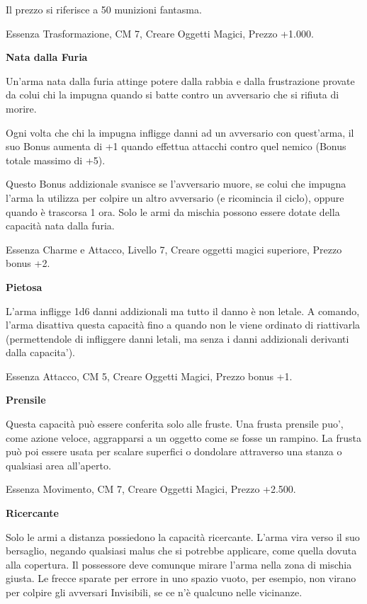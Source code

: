 \documentclass[a4paper,11pt,twoside,openany]{book}
\begin{document}
Il prezzo si riferisce a 50 munizioni fantasma.

Essenza Trasformazione, CM 7, Creare Oggetti Magici, Prezzo +1.000.

\textbf{Nata dalla Furia}

Un'arma nata dalla furia attinge potere dalla rabbia e dalla frustrazione provate da colui chi la impugna quando si batte contro un avversario che si rifiuta di morire.

Ogni volta che chi la impugna infligge danni ad un avversario con quest'arma, il suo Bonus aumenta di +1 quando effettua attacchi contro quel nemico (Bonus totale massimo di +5).

Questo Bonus addizionale svanisce se l'avversario muore, se colui che impugna l'arma la utilizza per colpire un altro avversario (e ricomincia il ciclo), oppure quando è trascorsa 1 ora. Solo le armi da mischia possono essere dotate della capacità nata dalla furia.

Essenza Charme e Attacco, Livello 7, Creare oggetti magici superiore, Prezzo bonus +2.

\textbf{Pietosa}

L'arma infligge 1d6 danni addizionali ma tutto il danno è non letale. A comando, l'arma disattiva questa capacità fino a quando non le viene ordinato di riattivarla (permettendole di infliggere danni letali, ma senza i danni addizionali derivanti dalla capacita').

Essenza Attacco, CM 5, Creare Oggetti Magici, Prezzo bonus +1.

\textbf{Prensile}

Questa capacità può essere conferita solo alle fruste. Una frusta prensile puo', come azione veloce, aggrapparsi a un oggetto come se fosse un rampino. La frusta può poi essere usata per scalare superfici o dondolare attraverso una stanza o qualsiasi area all'aperto.

Essenza Movimento, CM 7, Creare Oggetti Magici, Prezzo +2.500.

\textbf{Ricercante}

Solo le armi a distanza possiedono la capacità ricercante. L'arma vira verso il suo bersaglio, negando qualsiasi malus che si potrebbe applicare, come quella dovuta alla copertura. Il possessore deve comunque mirare l'arma nella zona di mischia giusta. Le frecce sparate per errore in uno spazio vuoto, per esempio, non virano per colpire gli avversari Invisibili, se ce n'è qualcuno nelle vicinanze.
\end{document}
